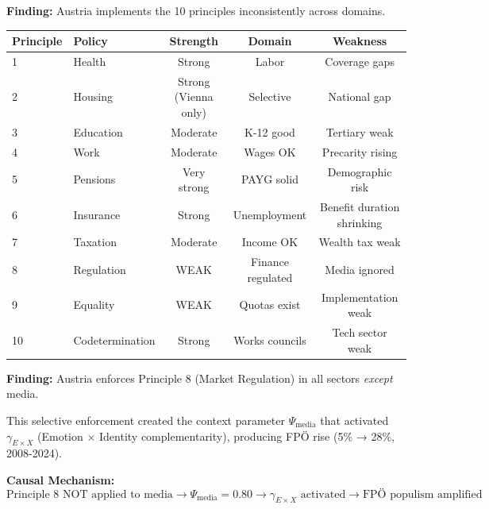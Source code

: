 \begin{tcolorbox}[colback=green!5!white, colframe=green!75!black,
    title=Result BF-R1: Policy Consistency Matrix]

\textbf{Finding:} Austria implements the 10 principles inconsistently across domains.

\begin{table}[h]
\centering
\small
\renewcommand{\arraystretch}{1.3}
\begin{tabular}{@{}llccc@{}}
\toprule
\textbf{Principle} & \textbf{Policy} & \textbf{Strength} & \textbf{Domain} & \textbf{Weakness} \\
\midrule
1 & Health & Strong & Labor & Coverage gaps \\
2 & Housing & Strong (Vienna only) & Selective & National gap \\
3 & Education & Moderate & K-12 good & Tertiary weak \\
4 & Work & Moderate & Wages OK & Precarity rising \\
5 & Pensions & Very strong & PAYG solid & Demographic risk \\
6 & Insurance & Strong & Unemployment & Benefit duration shrinking \\
7 & Taxation & Moderate & Income OK & Wealth tax weak \\
8 & Regulation & WEAK & Finance regulated & Media ignored \\
9 & Equality & WEAK & Quotas exist & Implementation weak \\
10 & Codetermination & Strong & Works councils & Tech sector weak \\
\bottomrule
\end{tabular}
\end{table}

\end{tcolorbox}

\begin{tcolorbox}[colback=green!5!white, colframe=green!75!black,
    title=Result BF-R2: The Media Regulation Gap]

\textbf{Finding:} Austria enforces Principle 8 (Market Regulation) in all sectors \textit{except} media.

This selective enforcement created the context parameter $\Psi_{\text{media}}$ that activated $\gamma_{E \times X}$ (Emotion $\times$ Identity complementarity), producing FPÖ rise (5\% → 28\%, 2008-2024).

\textbf{Causal Mechanism:}
\begin{equation}
\text{Principle 8 NOT applied to media} \rightarrow \Psi_{\text{media}} = 0.80 \rightarrow \gamma_{E \times X} \text{ activated} \rightarrow \text{FPÖ populism amplified}
\end{equation}

\end{tcolorbox}

